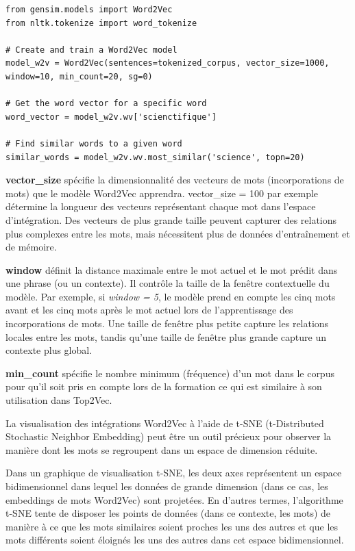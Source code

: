 \begin{lstlisting}
from gensim.models import Word2Vec
from nltk.tokenize import word_tokenize

# Create and train a Word2Vec model
model_w2v = Word2Vec(sentences=tokenized_corpus, vector_size=1000, window=10, min_count=20, sg=0)

# Get the word vector for a specific word
word_vector = model_w2v.wv['scienctifique']

# Find similar words to a given word
similar_words = model_w2v.wv.most_similar('science', topn=20)

\end{lstlisting}

\textbf{vector\_size} spécifie la dimensionnalité des vecteurs de mots (incorporations de mots) que le modèle Word2Vec apprendra. vector\_size = 100 par exemple détermine la longueur des vecteurs représentant chaque mot dans l'espace d'intégration. Des vecteurs de plus grande taille peuvent capturer des relations plus complexes entre les mots, mais nécessitent plus de données d'entraînement et de mémoire.

\textbf{window} définit la distance maximale entre le mot actuel et le mot prédit dans une phrase (ou un contexte).
Il contrôle la taille de la fenêtre contextuelle du modèle.
Par exemple, si \textit{window = 5}, le modèle prend en compte les cinq mots avant et les cinq mots après le mot actuel lors de l'apprentissage des incorporations de mots.
Une taille de fenêtre plus petite capture les relations locales entre les mots, tandis qu'une taille de fenêtre plus grande capture un contexte plus global.

\textbf{min\_count }spécifie le nombre minimum (fréquence) d'un mot dans le corpus pour qu'il soit pris en compte lors de la formation ce qui est similaire à son utilisation dans Top2Vec.

La visualisation des intégrations Word2Vec à l'aide de t-SNE (t-Distributed Stochastic Neighbor Embedding) peut être un outil précieux pour observer la manière dont les mots se regroupent dans un espace de dimension réduite.

Dans un graphique de visualisation t-SNE, les deux axes représentent un espace bidimensionnel dans lequel les données de grande dimension (dans ce cas, les embeddings de mots Word2Vec) sont projetées. En d'autres termes, l'algorithme t-SNE tente de disposer les points de données (dans ce contexte, les mots) de manière à ce que les mots similaires soient proches les uns des autres et que les mots différents soient éloignés les uns des autres dans cet espace bidimensionnel.

